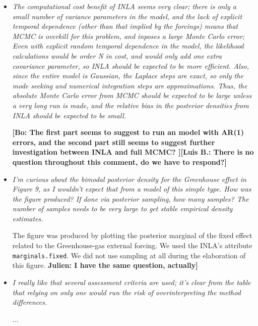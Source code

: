 \documentclass[11pt]{article}
\newcommand{\lb}[1]{\color{ForestGreen}\textbf{[Luis B.: #1]}\normalcolor}
\newcommand{\bl}[1]{\color{red}\textbf{[Bo: #1]}\normalcolor}
\newcommand{\jeg}[1]{\color{blue}\textbf{Julien: #1]}\normalcolor}
\begin{document}
\begin{itemize}
Despite the fact that: (1) we used less precise priors for INLA and (2) we used
the same model for both approaches, we think that the
difference in terms of posterior is not due to the prior choice, on the contrary
an
acceptable level of mixing in the MCMC chains of the external-forcing parameters
is hard to attain and this can be the main cause why we see differences. In
addition, the
dimension of the latent variable is quite large compared with the one computed
in Barboza et al, 2014; and this fact can produce mixing issues in the
MCMC procedure that we did not have previously.  

\bl{I think we used the same model. The two plots have the same calibration
  period?}

\item \textit{The computational cost benefit of INLA seems very clear; there is
  only a small number of variance parameters in the model, and the
  lack of explicit temporal dependence (other than that implied by the
  forcings) means that MCMC is overkill for this problem, and inposes
  a large Monte Carlo error; Even with explicit random temporal
  dependence in the model, the likelihood calculations would be order
  N in cost, and would only add one extra covariance parameter, so
  INLA should be expected to be more efficient.  Also, since the
  entire model is Gaussian, the Laplace steps are exact, so only the
  mode seeking and numerical integration steps are approximations.
  Thus, the absolute Monte Carlo error from MCMC should be expected to
  be large unless a very long run is made, and the relative bias in
  the posterior densities from INLA should be expected to be small.}

\bl{The first part seems to suggest to run an model with AR(1) errors, and the
  second part still seems to suggest further investigation between INLA and full
  MCMC? }\lb{There is no question throughout this comment, do we have to
  respond?}

\item \textit{I'm curious about the bimodal posterior density for the Greenhouse
  effect in Figure 9, as I wouldn't expect that from a model of this
  simple type.  How was the figure produced? If done via posterior
  sampling, how many samples? The number of samples needs to be very
  large to get stable empirical density estimates.}

The figure was produced by plotting the posterior marginal of the fixed effect
related to the Greenhouse-gas external forcing. We used the INLA's attribute
\verb|marginals.fixed|. We did not use sampling at all during the elaboration of
this figure.   
\jeg{I have the same question, actually}


\item \textit{I really like that several assessment criteria are used; it's clear
  from the table that relying on only one would run the risk of
  overinterpreting the method differences.}

...

\end{itemize}
\end{document}
